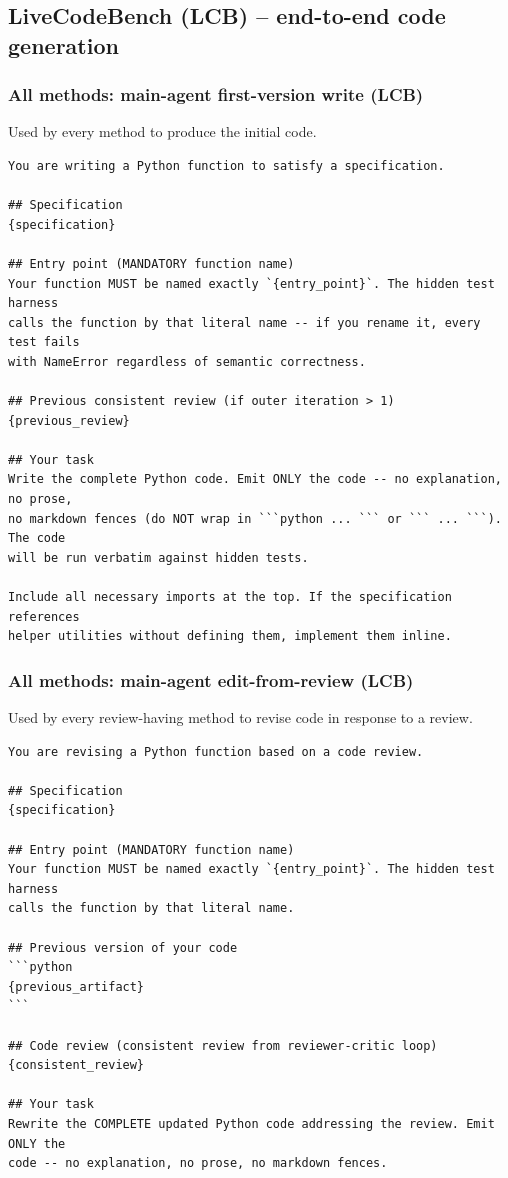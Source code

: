 \documentclass{article}
\begin{document}
\subsection{LiveCodeBench (LCB) -- end-to-end code generation}
\label{app:prompts-lcb}

\subsubsection{All methods: main-agent first-version write (LCB)}
\label{app:prompts-lcb-m-write}
\label{app:prompts-lcb-write}

Used by every method to produce the initial code.

\begin{footnotesize}
\begin{verbatim}
You are writing a Python function to satisfy a specification.

## Specification
{specification}

## Entry point (MANDATORY function name)
Your function MUST be named exactly `{entry_point}`. The hidden test harness
calls the function by that literal name -- if you rename it, every test fails
with NameError regardless of semantic correctness.

## Previous consistent review (if outer iteration > 1)
{previous_review}

## Your task
Write the complete Python code. Emit ONLY the code -- no explanation, no prose,
no markdown fences (do NOT wrap in ```python ... ``` or ``` ... ```). The code
will be run verbatim against hidden tests.

Include all necessary imports at the top. If the specification references
helper utilities without defining them, implement them inline.
\end{verbatim}
\end{footnotesize}

\subsubsection{All methods: main-agent edit-from-review (LCB)}
\label{app:prompts-lcb-m-edit}

Used by every review-having method to revise code in response to a review.

\begin{footnotesize}
\begin{verbatim}
You are revising a Python function based on a code review.

## Specification
{specification}

## Entry point (MANDATORY function name)
Your function MUST be named exactly `{entry_point}`. The hidden test harness
calls the function by that literal name.

## Previous version of your code
```python
{previous_artifact}
```

## Code review (consistent review from reviewer-critic loop)
{consistent_review}

## Your task
Rewrite the COMPLETE updated Python code addressing the review. Emit ONLY the
code -- no explanation, no prose, no markdown fences.
\end{verbatim}
\end{footnotesize}
\end{document}
